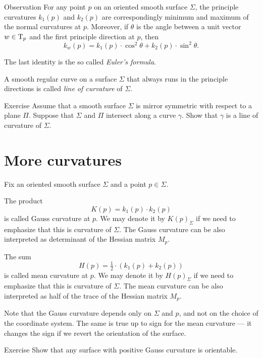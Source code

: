 \begin{thm}{Observation}\label{obs:k1-k2}
For any point $p$ on an oriented smooth surface $\Sigma$,
the principle curvatures $k_1(p)$ and $k_2(p)$ are correspondingly minimum and maximum of the normal curvatures at $p$.
Moreover, if $\theta$ is the angle between a unit vector $w\in\mathrm{T}_p$ and the first principle direction at $p$, then 
\[k_w(p)=k_1(p)\cdot\cos^2\theta+k_2(p)\cdot\sin^2\theta.\]

\end{thm}

The last identity is the so called \emph{Euler's formula}.

A smooth regular curve on a surface $\Sigma$ that always runs in the principle directions is called \emph{line of curvature} of $\Sigma$.  

\begin{thm}{Exercise}\label{ex:line-of-curvature}
Assume that a smooth surface $\Sigma$ is mirror symmetric with respect to  a plane $\Pi$.
Suppose that $\Sigma$ and $\Pi$ intersect along a curve $\gamma$.
Show that $\gamma$ is a line of curvature of $\Sigma$.
\end{thm}

\section*{More curvatures}

Fix an oriented smooth surface $\Sigma$ and a point $p\in\Sigma$.

The product 
\[K(p)=k_1(p)\cdot k_2(p)\]
is called Gauss curvature at $p$.
We may denote it by $K(p)_\Sigma$ if we need to emphasize that this is curvature of $\Sigma$.
The Gauss curvature can be also interpreted as determinant of the Hessian matrix $M_p$.

The sum 
\[H(p)=\tfrac12\cdot(k_1(p)+ k_2(p))\] %
is called mean curvature at $p$.
We may denote it by $H(p)_\Sigma$ if we need to emphasize that this is curvature of $\Sigma$.
The mean curvature can be also interpreted as half of the trace of the Hessian matrix $M_p$. %

Note that the Gauss curvature depends only on $\Sigma$ and $p$,
and not on the choice of the coordinate system.
The same is true up to sign for the mean curvature --- it changes the sign if we revert the orientation of the surface.

\begin{thm}{Exercise}\label{ex:gauss+orientable}
Show that any surface with positive Gauss curvature is orientable. 
\end{thm}


